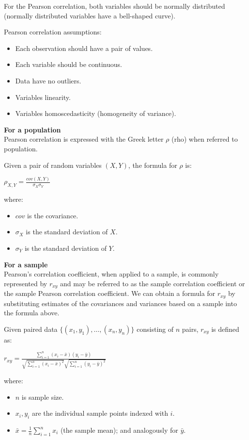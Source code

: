 \documentclass{article}
\begin{document}
For the Pearson correlation, both variables should be normally distributed (normally distributed variables have a bell-shaped curve). 

Pearson correlation assumptions:
\begin{itemize}
    \item Each observation should have a pair of values.
    \item Each variable should be continuous.
    \item Data have no outliers.
    \item Variables linearity.
    \item Variables homoscedasticity (homogeneity of variance).
\end{itemize}

\textbf{For a population}\\
Pearson correlation is expressed with the Greek letter $\rho$ (rho) when referred to population.

Given a pair of random variables $(X,Y)$, the formula for $\rho$ is:

$\displaystyle \rho _{X,Y}={\frac{cov(X,Y)}{\sigma _{X}\sigma _{Y}}}$

where:
\begin{itemize}
    \item $\displaystyle {cov}$ is the covariance.
    \item $\displaystyle \sigma _{X}$ is the standard deviation of $X$.
    \item $\displaystyle \sigma _{Y}$  is the standard deviation of $Y$.
\end{itemize}

\textbf{For a sample}\\
Pearson's correlation coefficient, when applied to a sample, is commonly represented by $r_{xy}$ and may be referred to as the sample correlation coefficient or the sample Pearson correlation coefficient. 
We can obtain a formula for $r_{xy}$ by substituting estimates of the covariances and variances based on a sample into the formula above. 

Given paired data $\displaystyle \{(x_{1},y_{1}),\ldots ,(x_{n},y_{n})\}$ consisting of $n$ pairs, $r_{xy}$ is defined as:

$\displaystyle r_{xy}={\frac {\sum _{i=1}^{n}(x_{i}-{\bar {x}})(y_{i}-{\bar {y}})}{{\sqrt {\sum _{i=1}^{n}(x_{i}-{\bar {x}})^{2}}}{\sqrt {\sum _{i=1}^{n}(y_{i}-{\bar {y}})^{2}}}}}$

where:
\begin{itemize}
    \item $n$ is sample size.
    \item $x_{i},y_{i}$ are the individual sample points indexed with $i$.
    \item ${\textstyle {\bar {x}}={\frac {1}{n}}\sum _{i=1}^{n}x_{i}}$ (the sample mean); and analogously for $\bar {y}$.
\end{itemize}
\end{document}
